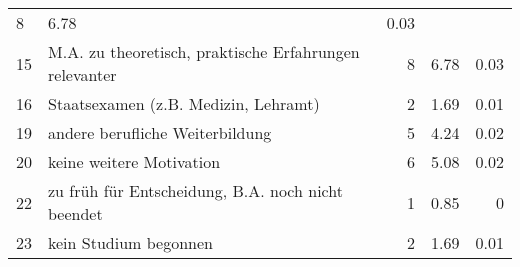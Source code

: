 \begin{longtable}{lXrrr}
       \num{8} &
       \num[round-mode=places,round-precision=2]{6.78} &
         \num[round-mode=places,round-precision=2]{0.03} \\

     15 &
     \multicolumn{1}{X}{ M.A. zu theoretisch, praktische Erfahrungen relevanter   } &


       \num{8} &
       \num[round-mode=places,round-precision=2]{6.78} &
         \num[round-mode=places,round-precision=2]{0.03} \\

     16 &
     \multicolumn{1}{X}{ Staatsexamen (z.B. Medizin, Lehramt)   } &


       \num{2} &
       \num[round-mode=places,round-precision=2]{1.69} &
         \num[round-mode=places,round-precision=2]{0.01} \\

     19 &
     \multicolumn{1}{X}{ andere berufliche Weiterbildung   } &


       \num{5} &
       \num[round-mode=places,round-precision=2]{4.24} &
         \num[round-mode=places,round-precision=2]{0.02} \\

     20 &
     \multicolumn{1}{X}{ keine weitere Motivation   } &


       \num{6} &
       \num[round-mode=places,round-precision=2]{5.08} &
         \num[round-mode=places,round-precision=2]{0.02} \\

     22 &
     \multicolumn{1}{X}{ zu früh für Entscheidung, B.A. noch nicht beendet   } &


       \num{1} &
       \num[round-mode=places,round-precision=2]{0.85} &
         \num[round-mode=places,round-precision=2]{0} \\

     23 &
     \multicolumn{1}{X}{ kein Studium begonnen   } &


       \num{2} &
       \num[round-mode=places,round-precision=2]{1.69} &
         \num[round-mode=places,round-precision=2]{0.01} \\


\end{longtable}
